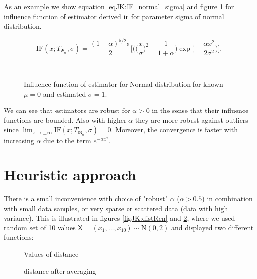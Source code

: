 {As an example we show equation \eqref{eqJK:IF_normal_sigma} and figure \ref{figJK:IF_normal_sigma} for influence function of \R estimator derived in \cite{Vajda2009} for parameter sigma of normal distribution.

\begin{equation}
\text{IF}(x;T_{\mathfrak{R}_{\alpha}},\sigma) = \frac{(1+\alpha)^{5/2}\sigma}{2}\biggl[\biggl(\biggl(\frac{x}{\sigma}\biggr)^2-\frac{1}{1+\alpha}\biggr) \exp\biggl(-\frac{\alpha x^2}{2\sigma^2}\biggr)\biggr].
\label{eqJK:IF_normal_sigma}
\end{equation}

\begin{figure}[ht]
\begin{center}
	\\
\caption{Influence function of \R estimator for Normal distribution for known $\mu = 0$ and estimated $\sigma = 1$.}
\end{center}
\label{figJK:IF_normal_sigma}
\end{figure}
We can see that \R estimators are robust for $\alpha > 0$ in the sense that their influence functions are bounded. Also with higher $\alpha$ they are more robust against outliers since $\lim_{x\rightarrow \pm\infty}\mathrm{IF}(x;T_{\mathfrak{R}_\alpha},\sigma) = 0 $. Moreover, the convergence is faster with increasing $\alpha$ due to the term $e^{-\alpha x^2}$.

\section{Heuristic approach}
There is a small inconvenience with choice of "robust" $\alpha$ ($\alpha > 0.5$) in combination with small data samples, or very sparse or scattered data (data with high variance). This is illustrated in figures \ref{figJK:distRen} and \ref{figJK:distRenPlate}, where we used random set of 10 values $\mathsf{X} = (x_1, \ldots, x_{10}) \sim \mathrm{N}(0,2)$ and displayed two different functions:

\begin{figure}[ht]
\centering
\begin{minipage}{.5\textwidth}
  \centering
  \caption{Values of \R distance }
  \label{figJK:distRen}
\end{minipage}%
\begin{minipage}{.5\textwidth}
  \centering
  \caption{\R distance after averaging}
  \label{figJK:distRenPlate}
\end{minipage}
\end{figure}

}

